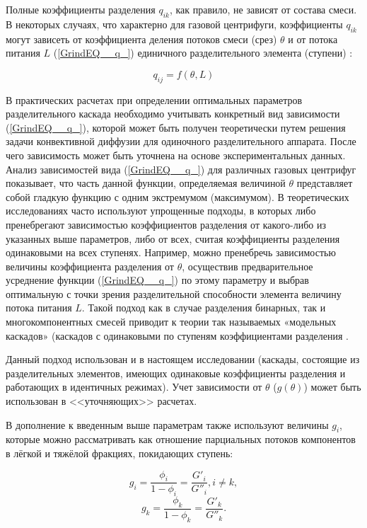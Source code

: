 Полные коэффициенты разделения $q_{ik} $, как правило, не зависят от состава смеси. В некоторых случаях, что характерно для газовой центрифуги, коэффициенты $q_{ik}$ могут зависеть от коэффициента деления потоков смеси (срез) $\theta$ и от потока питания $L$ (\ref{GrindEQ__q_}) единичного разделительного элемента (ступени) \cite{mustafinObjectiveFunctionOptimization2019}:

\begin{equation} \label{GrindEQ__q_} 
  q_{ij} = f(\theta, L)          
\end{equation}

В практических расчетах при определении оптимальных параметров разделительного каскада необходимо учитывать конкретный вид зависимости (\ref{GrindEQ__q_}), которой может быть получен теоретически путем решения задачи конвективной диффузии для одиночного разделительного аппарата. После чего зависимость может быть уточнена на основе экспериментальных данных. 
Анализ зависимостей вида (\ref{GrindEQ__q_}) для различных газовых центрифуг показывает, что часть данной функции, определяемая величиной $\theta $ представляет собой гладкую функцию с одним экстремумом (максимумом). В теоретических исследованиях часто используют упрощенные подходы, в которых либо пренебрегают зависимостью коэффициентов разделения от какого-либо из указанных выше параметров, либо от всех, считая коэффициенты разделения одинаковыми на всех ступенях. Например, можно пренебречь зависимостью величины коэффициента разделения от $\theta$, осуществив предварительное усреднение функции (\ref{GrindEQ__q_}) по этому параметру и выбрав оптимальную с точки зрения разделительной способности элемента величину потока питания $L$. Такой подход как в случае разделения бинарных, так и многокомпонентных смесей приводит к теории так называемых «модельных каскадов» (каскадов с одинаковыми по ступеням коэффициентами разделения \cite{sulaberidzeClassificationModelCascades2020}.

Данный подход использован и в настоящем исследовании (каскады, состоящие из разделительных элементов, имеющих одинаковые коэффициенты разделения и работающих в идентичных режимах). Учет зависимости от $\theta$ ($g(\theta)$) может быть использован в <<уточняющих>> расчетах.

В дополнение к введенным выше параметрам также используют величины $g_{i}$, которые можно рассматривать как отношение парциальных потоков компонентов в лёгкой и тяжёлой фракциях, покидающих ступень:

\begin{equation} \label{GrindEQ__1_13_} 
  g_{i} =\frac{\phi _{i} }{1-\phi _{i} } =\frac{G'_{i} }{G''_{i} } , i\ne k, 
  \end{equation} 
  \begin{equation} \label{GrindEQ__1_14_} 
  g_{k} =\frac{\phi _{k} }{1-\phi _{k} } =\frac{G'_{k} }{G''_{k} } .           
\end{equation} 

